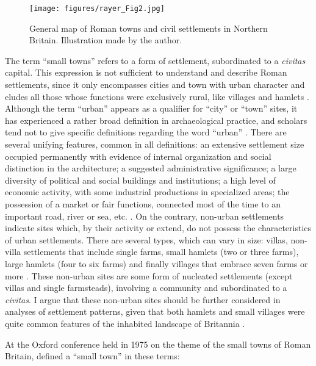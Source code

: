 	\begin{figure}
		\texttt{[image: figures/rayer\_Fig2.jpg]}
		\caption{General map of Roman towns and civil settlements in Northern Britain. Illustration made by the author.}
		\label{fig:Rayer_Fig2}
	\end{figure}
The term “small towns” refers to a form of settlement, subordinated to a \textit{civitas} capital. This expression is not sufficient to understand and describe Roman settlements, since it only encompasses cities and town with urban character and eludes all those whose functions were exclusively rural, like villages and hamlets \parencites{Favory_2012}{Rivet_1975b}{Smith_1987}{Todd_1970}{Wacher_1995}. Although the term “urban” appears as a qualifier for “city” or “town” sites, it has experienced a rather broad definition in archaeological practice, and scholars tend not to give specific definitions regarding the word “urban” \parencite[29]{Renfrew_2008}. There are several unifying features, common in all definitions: an extensive settlement size occupied permanently with evidence of internal organization and social distinction in the architecture; a suggested administrative significance; a large diversity of political and social buildings and institutions; a high level of economic activity, with some industrial productions in specialized areas; the possession of a market or fair functions, connected most of the time to an important road, river or sea, etc. \parencite[29]{Renfrew_2008}. On the contrary, non-urban settlements indicate sites which, by their activity or extend, do not possess the characteristics of urban settlements. There are several types, which can vary in size: villas, non-villa settlements that include single farms, small hamlets (two or three farms), large hamlets (four to six farms) and finally villages that embrace seven farms or more \parencite[76]{Hingley_1989}. These non-urban sites are some form of nucleated settlements (except villas and single farmsteads), involving a community and subordinated to a \textit{civitas}. I argue that these non-urban sites should be further considered in analyses of settlement patterns, given that both hamlets and small villages were quite common features of the inhabited landscape of Britannia \parencites[cf.][]{Hingley_1989}{Hanley_2000}. 

At the Oxford conference held in 1975 on the theme of the small towns of Roman Britain, \textcite[1]{Rodwell_1975} defined a “small town” in these terms:

